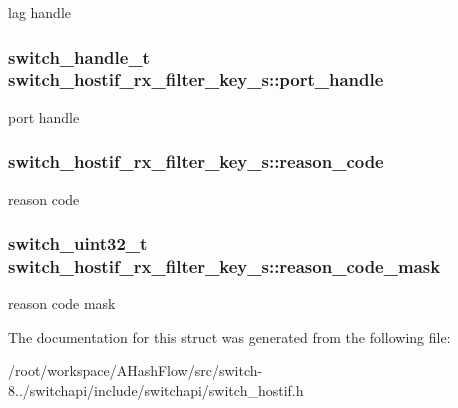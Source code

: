 lag handle \hypertarget{structswitch__hostif__rx__filter__key__s_a301a6fff09f069ff906bf2da948040b0}{
\subsubsection[{port\+\_\+handle}]{\setlength{\rightskip}{0pt plus 5cm}switch\+\_\+handle\+\_\+t switch\+\_\+hostif\+\_\+rx\+\_\+filter\+\_\+key\+\_\+s\+::port\+\_\+handle}}\label{structswitch__hostif__rx__filter__key__s_a301a6fff09f069ff906bf2da948040b0}
port handle \hypertarget{structswitch__hostif__rx__filter__key__s_a578ad7922c6456e96f71562a1fd2de61}{
\subsubsection[{reason\+\_\+code}]{ switch\+\_\+hostif\+\_\+rx\+\_\+filter\+\_\+key\+\_\+s\+::reason\+\_\+code}}\label{structswitch__hostif__rx__filter__key__s_a578ad7922c6456e96f71562a1fd2de61}
reason code \hypertarget{structswitch__hostif__rx__filter__key__s_a83a561e325a90201eaa5b6454884fa2b}{
\subsubsection[{reason\+\_\+code\+\_\+mask}]{\setlength{\rightskip}{0pt plus 5cm}switch\+\_\+uint32\+\_\+t switch\+\_\+hostif\+\_\+rx\+\_\+filter\+\_\+key\+\_\+s\+::reason\+\_\+code\+\_\+mask}}\label{structswitch__hostif__rx__filter__key__s_a83a561e325a90201eaa5b6454884fa2b}
reason code mask 

The documentation for this struct was generated from the following file\+:\begin{DoxyCompactItemize}
\item 
/root/workspace/\+A\+Hash\+Flow/src/switch-\/8../switchapi/include/switchapi/switch\+\_\+hostif.\+h\end{DoxyCompactItemize}
